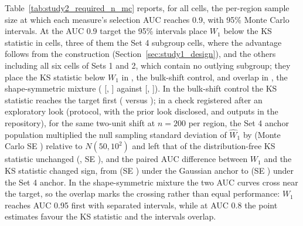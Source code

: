 \documentclass[AMA,Times1COL]{WileyNJDv5}
\begin{document}
Table~\ref{tab:study2_required_n_mc} reports, for all  cells, the per-region sample size at which each measure's selection AUC reaches 0.9, with 95\% Monte Carlo intervals. At the AUC 0.9 target the 95\% intervals place $W_1$ below the KS statistic in  cells, three of them the Set 4 subgroup cells, where the advantage follows from the construction (Section~\ref{sec:study1_design}), and the others including all six cells of Sets 1 and 2, which contain no outlying subgroup; they place the KS statistic below $W_1$ in , the bulk-shift control, and overlap in , the shape-symmetric mixture ( [, ] against  [, ]). In the bulk-shift control the KS statistic reaches the target first ( versus ); in a check registered after an exploratory look (protocol, with the prior look disclosed, and outputs in the repository), for the same two-unit shift at $n = 200$ per region, the Set 4 anchor population multiplied the null sampling standard deviation of $\widehat{W}_1$ by  (Monte Carlo SE ) relative to $N(50, 10^2)$ and left that of the distribution-free KS statistic unchanged (, SE ), and the paired AUC difference between $W_1$ and the KS statistic changed sign, from  (SE ) under the Gaussian anchor to  (SE ) under the Set 4 anchor.
In the shape-symmetric mixture the two AUC curves cross near the target, so the overlap marks the crossing rather than equal performance: $W_1$ reaches AUC 0.95 first with separated intervals, while at AUC 0.8 the point estimates favour the KS statistic and the intervals overlap.
\end{document}
